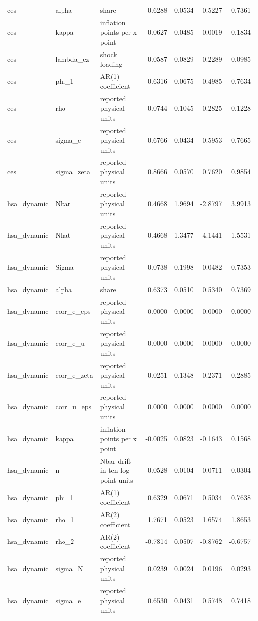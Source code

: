 \begin{tabular}{lllrrrr}
ces & alpha & share & 0.6288 & 0.0534 & 0.5227 & 0.7361 \\
ces & kappa & inflation points per x point & 0.0627 & 0.0485 & 0.0019 & 0.1834 \\
ces & lambda\_ez & shock loading & -0.0587 & 0.0829 & -0.2289 & 0.0985 \\
ces & phi\_1 & AR(1) coefficient & 0.6316 & 0.0675 & 0.4985 & 0.7634 \\
ces & rho & reported physical units & -0.0744 & 0.1045 & -0.2825 & 0.1228 \\
ces & sigma\_e & reported physical units & 0.6766 & 0.0434 & 0.5953 & 0.7665 \\
ces & sigma\_zeta & reported physical units & 0.8666 & 0.0570 & 0.7620 & 0.9854 \\
hsa\_dynamic & Nbar & reported physical units & 0.4668 & 1.9694 & -2.8797 & 3.9913 \\
hsa\_dynamic & Nhat & reported physical units & -0.4668 & 1.3477 & -4.1441 & 1.5531 \\
hsa\_dynamic & Sigma & reported physical units & 0.0738 & 0.1998 & -0.0482 & 0.7353 \\
hsa\_dynamic & alpha & share & 0.6373 & 0.0510 & 0.5340 & 0.7369 \\
hsa\_dynamic & corr\_e\_eps & reported physical units & 0.0000 & 0.0000 & 0.0000 & 0.0000 \\
hsa\_dynamic & corr\_e\_u & reported physical units & 0.0000 & 0.0000 & 0.0000 & 0.0000 \\
hsa\_dynamic & corr\_e\_zeta & reported physical units & 0.0251 & 0.1348 & -0.2371 & 0.2885 \\
hsa\_dynamic & corr\_u\_eps & reported physical units & 0.0000 & 0.0000 & 0.0000 & 0.0000 \\
hsa\_dynamic & kappa & inflation points per x point & -0.0025 & 0.0823 & -0.1643 & 0.1568 \\
hsa\_dynamic & n & Nbar drift in ten-log-point units & -0.0528 & 0.0104 & -0.0711 & -0.0304 \\
hsa\_dynamic & phi\_1 & AR(1) coefficient & 0.6329 & 0.0671 & 0.5034 & 0.7638 \\
hsa\_dynamic & rho\_1 & AR(2) coefficient & 1.7671 & 0.0523 & 1.6574 & 1.8653 \\
hsa\_dynamic & rho\_2 & AR(2) coefficient & -0.7814 & 0.0507 & -0.8762 & -0.6757 \\
hsa\_dynamic & sigma\_N & reported physical units & 0.0239 & 0.0024 & 0.0196 & 0.0293 \\
hsa\_dynamic & sigma\_e & reported physical units & 0.6530 & 0.0431 & 0.5748 & 0.7418 \\

\end{tabular}
